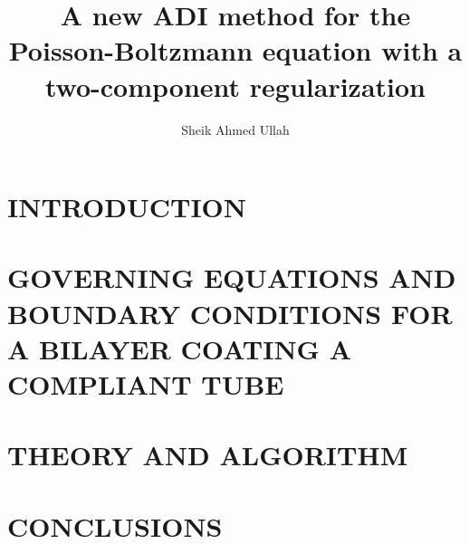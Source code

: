 \documentclass[dissertation]{uathesis}
\author{Sheik Ahmed Ullah}       %
\title{A new ADI method for the Poisson-Boltzmann equation with a two-component regularization}
\begin{document}
\makefrontmatter


\begin{body}

\chapter{INTRODUCTION}
\label{chap: introduction}



\chapter{\MakeUppercase{Governing equations and boundary conditions for a bilayer coating a compliant tube}}\label{chap: Governing_Eqn_boundary_conditions_dim}

\chapter{THEORY AND ALGORITHM}
\label{chap: theory}



\chapter{CONCLUSIONS}
\label{chap: conclusions}


\renewcommand{\bibname}{REFERENCES}
\begin{singlespace}


\label{bib}
\end{singlespace}

\appendix










\end{body}
\end{document}
